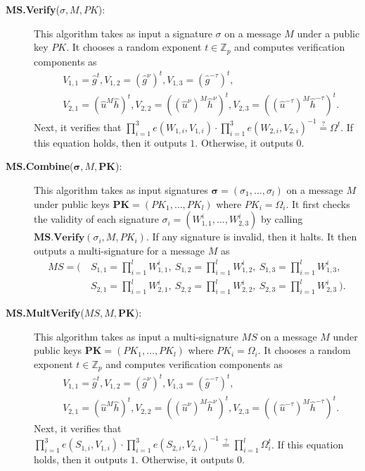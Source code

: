\documentclass[11pt,letterpaper]{article}
\newcommand{\vect}[1]{\mathbf{#1}}
\newcommand{\Z}{\mathbb{Z}}
\newcommand{\tb}[1]{\textbf{#1}}
\begin{document}
\begin{description}
\item [\tb{MS.Verify}($\sigma, M, PK$):] This algorithm takes as input a
    signature $\sigma$ on a message $M$ under a public key $PK$. It chooses
    a random exponent $t \in \Z_p$ and computes verification components as
    \begin{align*}
    &   V_{1,1} = \hat{g}^t,
        V_{1,2} = (\hat{g}^{\nu})^t,
        V_{1,3} = (\hat{g}^{-\tau})^t, \\
    &   V_{2,1} = (\hat{u}^M \hat{h})^t,
        V_{2,2} = ((\hat{u}^{\nu})^M \hat{h}^{\nu})^t,
        V_{2,3} = ((\hat{u}^{-\tau})^M \hat{h}^{-\tau})^t.
    \end{align*}
    Next, it verifies that $\prod_{i=1}^3 e(W_{1,i}, V_{1,i}) \cdot
    \prod_{i=1}^3 e(W_{2,i}, V_{2,i})^{-1} \stackrel{?}{=} \Omega^t$. If
    this equation holds, then it outputs $1$. Otherwise, it outputs $0$.

\item [\tb{MS.Combine}($\vect{\sigma}, M, \vect{PK}$):] This algorithm
    takes as input signatures $\vect{\sigma} = (\sigma_1, \ldots,
    \sigma_l)$ on a message $M$ under public keys $\vect{PK} = (PK_1,
    \ldots, PK_l)$ where $PK_i = \Omega_i$. It first checks the validity of
    each signature $\sigma_i = (W_{1,1}^i, \ldots, W_{2,3}^i)$ by calling
    $\tb{MS.Verify}(\sigma_i, M, PK_i)$. If any signature is invalid, then
    it halts. It then outputs a multi-signature for a message $M$ as
    \begin{align*}
    MS = \Big(~
    &   S_{1,1} = \prod_{i=1}^l W_{1,1}^i,~
        S_{1,2} = \prod_{i=1}^l W_{1,2}^i,~
        S_{1,3} = \prod_{i=1}^l W_{1,3}^i,~ \\
    &   S_{2,1} = \prod_{i=1}^l W_{2,1}^i,~
        S_{2,2} = \prod_{i=1}^l W_{2,2}^i,~
        S_{2,3} = \prod_{i=1}^l W_{2,3}^i
    ~\Big).
    \end{align*}

\item [\tb{MS.MultVerify}($MS, M, \vect{PK}$):] This algorithm takes as
    input a multi-signature $MS$ on a message $M$ under public keys
    $\vect{PK} = (PK_1, \ldots, PK_l)$ where $PK_i = \Omega_i$. It chooses
    a random exponent $t \in \Z_p$ and computes verification components as
    \begin{align*}
    &   V_{1,1} = \hat{g}^t,
        V_{1,2} = (\hat{g}^{\nu})^t,
        V_{1,3} = (\hat{g}^{-\tau})^t, \\
    &   V_{2,1} = (\hat{u}^M \hat{h})^t,
        V_{2,2} = ((\hat{u}^{\nu})^M \hat{h}^{\nu})^t,
        V_{2,3} = ((\hat{u}^{-\tau})^M \hat{h}^{-\tau})^t.
    \end{align*}
    Next, it verifies that $\prod_{i=1}^3 e(S_{1,i}, V_{1,i}) \cdot
    \prod_{i=1}^3 e(S_{2,i}, V_{2,i})^{-1} \stackrel{?}{=} \prod_{i=1}^l
    \Omega_i^t$. If this equation holds, then it outputs $1$. Otherwise, it
    outputs $0$.
\end{description}
\end{document}
